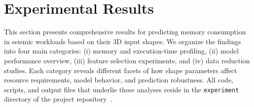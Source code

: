 \section{Experimental Results}
\label{sec:pmc-results}

This section presents comprehensive results for predicting memory consumption in seismic workloads based on their \ac{3D} input shapes.
We organize the findings into four main categories:
(i) memory and execution-time profiling,
(ii) model performance overview,
(iii) feature selection experiments,
and (iv) data reduction studies.
Each category reveals different facets of how shape parameters affect resource requirements, model behavior, and prediction robustness.
All code, scripts, and output files that underlie these analyses reside in the \texttt{experiment} directory of the project repository~\cite{delucca2025experiment2results}.






